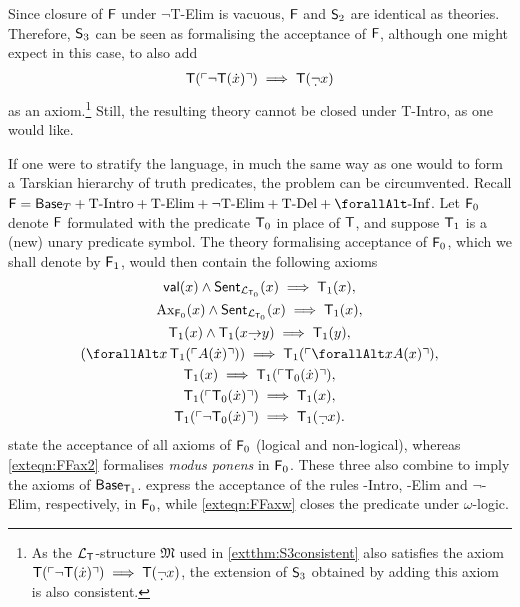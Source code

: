 \documentclass[UKenglish,cleveref,DIV=12]{scrartcl}
\let\forall\forallAlt
\theoremstyle{definition}
\theoremstyle{definition}
\begin{document}
Since closure of $\mathsf{F}$ under $\lnot$T-Elim is vacuous, $\mathsf{F}$ and $\mathsf{S}_2$ are identical as theories. Therefore, $\mathsf{S}_3$ can be seen as formalising the acceptance of $\mathsf{F}$, although one might expect in this case, to also add
\begin{align*}%
  \T(\gn{\lnot \T(\dot x)})\implies \T(\dlnot x)
\end{align*}
as an axiom.\footnote{As the $\mathcal{L}_{\mathsf{T}}$-structure $\mathfrak{M}$ used in \cref{extthm:S3consistent} also satisfies the axiom $\T(\gn{\lnot \T(\dot x)})\implies \T(\dlnot x)$, the extension of $\mathsf{S}_3$ obtained by adding this axiom is also consistent.} Still, the resulting theory cannot be closed under T-Intro, as one would like.

If one were to stratify the language, in much the same way as one would to form a Tarskian hierarchy of truth predicates, the problem can be circumvented. Recall $\F=\BaseT+\text{T-Intro}+\text{T-Elim}+\text{$\lnot$T-Elim}+\text{T-Del}+\text{$\forall$-Inf}$. Let $\mathsf{F}_0$ denote $\mathsf{F}$ formulated with the predicate $\mathsf{T}_0$ in place of $\mathsf{T}$, and suppose $\mathsf{T}_1$ is a (new) unary predicate symbol. The theory formalising acceptance of $\mathsf{F}_0$, which we shall denote by $\mathsf{F}_1$, would then contain the following axioms
\begin{gather}
  \valid(x)\land\Sent_{\L_{\T_0}}(x)\implies \T_1(x),\label{exteqn:FFax0}\\
  \set{Ax}_{\F_0}(x)\land\Sent_{\L_{\T_0}}(x)\implies \T_1(x),\label{exteqn:FFax1}\\
  \T_1(x)\land \T_1(x\dimplies y)\implies \T_1(y),\label{exteqn:FFax2}\\
  (\forall x\,\T_1(\gn{A(\dot x)}))\implies \T_1(\gn{\forall xA(x)}),\label{exteqn:FFaxw}\\
  \T_1(x)\implies \T_1(\gn{\T_0(\dot x)}),\label{exteqn:FFax3}\\
  \T_1(\gn{\T_0(\dot x)})\implies \T_1(x),\label{exteqn:FFax4}\\
  \T_1(\gn{\lnot \T_0(\dot x)})\implies \T_1(\dlnot x).\label{exteqn:FFax5}
\end{gather}
 state the acceptance of all axioms of $\mathsf{F}_0$ (logical and non-logical), whereas \cref{exteqn:FFax2} formalises {\em modus ponens} in $\mathsf{F}_0$. These three also combine to imply the axioms of $\mathsf{Base}_{\mathsf{T}_1}$.  express the acceptance of the rules -Intro, -Elim and
$\lnot$-Elim, respectively, in $\mathsf{F}_0$, while \cref{exteqn:FFaxw} closes the
predicate under $\omega$-logic.
\end{document}
